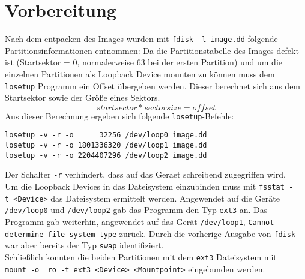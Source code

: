 \section{Vorbereitung}

Nach dem entpacken des Images wurden mit \texttt{fdisk~-l~image.dd} folgende Partitionsinformationen entnommen:
\lstset{basicstyle=\footnotesize}
Da die Partitionstabelle des Images defekt ist (Startsektor = 0, normalerweise 63 bei der ersten Partition) und um die einzelnen Partitionen als Loopback Device mounten zu können muss dem \texttt{losetup} Programm ein Offset übergeben werden. Dieser berechnet sich aus dem Startsektor sowie der Größe eines Sektors.\[startsector*sectorsize=offset\]
Aus dieser Berechnung ergeben sich folgende \texttt{losetup}-Befehle:

\begin{verbatim}
losetup -v -r -o      32256 /dev/loop0 image.dd
losetup -v -r -o 1801336320 /dev/loop1 image.dd
losetup -v -r -o 2204407296 /dev/loop2 image.dd
\end{verbatim}
\noindent Der Schalter \texttt{-r} verhindert, dass auf das Geraet schreibend zugegriffen wird.\\

Um die Loopback Devices in das Dateisystem einzubinden muss mit \texttt{fsstat~-t~<Device>} das Dateisystem ermittelt werden. Angewendet auf die Geräte \texttt{/dev/loop0} und \texttt{/dev/loop2} gab das Programm den Typ \texttt{ext3} an. Das Programm gab weiterhin, angewendet auf das Gerät \texttt{/dev/loop1}, \texttt{Cannot determine file system type} zurück. Durch die vorherige Ausgabe von \texttt{fdisk} war aber bereits der Typ \texttt{swap} identifiziert.\\

Schließlich konnten die beiden Partitionen mit dem \texttt{ext3} Dateisystem mit \texttt{mount~-o ~ro~-t~ext3~<Device>~<Mountpoint>} eingebunden werden.